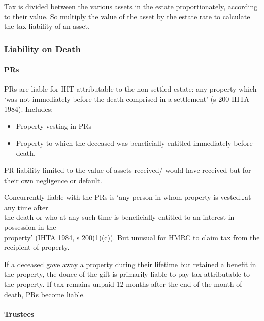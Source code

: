 \documentclass[
]{article}
\newenvironment{Shaded}{}{}
\newcommand{\NormalTok}[1]{#1}
\providecommand{\tightlist}{%
  \setlength{\itemsep}{0pt}\setlength{\parskip}{0pt}}
\begin{document}
Tax is divided between the various assets in the estate proportionately,
according to their value. So multiply the value of the asset by the
estate rate to calculate the tax liability of an asset.

\hypertarget{liability-on-death}{%
\subsubsection{Liability on Death}\label{liability-on-death}}

\hypertarget{prs}{%
\paragraph{PRs}\label{prs}}

PRs are liable for IHT attributable to the non-settled estate: any
property which `was not immediately before the death comprised in a
settlement' (s 200 IHTA 1984). Includes:

\begin{itemize}
\tightlist
\item
  Property vesting in PRs
\item
  Property to which the deceased was beneficially entitled immediately
  before death.
\end{itemize}

\begin{Shaded}
\begin{Highlighting}[]
\NormalTok{PR liability limited to the value of assets received/ would have received but for their own negligence or default. }
\end{Highlighting}
\end{Shaded}

Concurrently liable with the PRs is `any person in whom property is
vested\ldots at any time after\\
the death or who at any such time is beneficially entitled to an
interest in possession in the\\
property' (IHTA 1984, s 200(1)(c)). But unusual for HMRC to claim tax
from the recipient of property.

If a deceased gave away a property during their lifetime but retained a
benefit in the property, the donee of the gift is primarily liable to
pay tax attributable to the property. If tax remains unpaid 12 months
after the end of the month of death, PRs become liable.

\hypertarget{trustees}{%
\paragraph{Trustees}\label{trustees}}
\end{document}
